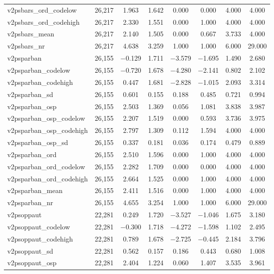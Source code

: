 \begin{table}[!htbp]
\begin{tabular}{@{\extracolsep{5pt}}lccccccc}
v2psbars\_ord\_codelow & 26,217 & 1.963 & 1.642 & 0.000 & 0.000 & 4.000 & 4.000 \\ 
v2psbars\_ord\_codehigh & 26,217 & 2.330 & 1.551 & 0.000 & 1.000 & 4.000 & 4.000 \\ 
v2psbars\_mean & 26,217 & 2.140 & 1.505 & 0.000 & 0.667 & 3.733 & 4.000 \\ 
v2psbars\_nr & 26,217 & 4.638 & 3.259 & 1.000 & 1.000 & 6.000 & 29.000 \\ 
v2psparban & 26,155 & $-$0.129 & 1.711 & $-$3.579 & $-$1.695 & 1.490 & 2.680 \\ 
v2psparban\_codelow & 26,155 & $-$0.720 & 1.678 & $-$4.280 & $-$2.141 & 0.802 & 2.102 \\ 
v2psparban\_codehigh & 26,155 & 0.447 & 1.681 & $-$2.828 & $-$1.015 & 2.093 & 3.314 \\ 
v2psparban\_sd & 26,155 & 0.601 & 0.155 & 0.188 & 0.485 & 0.721 & 0.994 \\ 
v2psparban\_osp & 26,155 & 2.503 & 1.369 & 0.056 & 1.081 & 3.838 & 3.987 \\ 
v2psparban\_osp\_codelow & 26,155 & 2.207 & 1.519 & 0.000 & 0.593 & 3.736 & 3.975 \\ 
v2psparban\_osp\_codehigh & 26,155 & 2.797 & 1.309 & 0.112 & 1.594 & 4.000 & 4.000 \\ 
v2psparban\_osp\_sd & 26,155 & 0.337 & 0.181 & 0.036 & 0.174 & 0.479 & 0.889 \\ 
v2psparban\_ord & 26,155 & 2.510 & 1.596 & 0.000 & 1.000 & 4.000 & 4.000 \\ 
v2psparban\_ord\_codelow & 26,155 & 2.282 & 1.709 & 0.000 & 0.000 & 4.000 & 4.000 \\ 
v2psparban\_ord\_codehigh & 26,155 & 2.664 & 1.525 & 0.000 & 1.000 & 4.000 & 4.000 \\ 
v2psparban\_mean & 26,155 & 2.411 & 1.516 & 0.000 & 1.000 & 4.000 & 4.000 \\ 
v2psparban\_nr & 26,155 & 4.655 & 3.254 & 1.000 & 1.000 & 6.000 & 29.000 \\ 
v2psoppaut & 22,281 & 0.249 & 1.720 & $-$3.527 & $-$1.046 & 1.675 & 3.180 \\ 
v2psoppaut\_codelow & 22,281 & $-$0.300 & 1.718 & $-$4.272 & $-$1.598 & 1.102 & 2.495 \\ 
v2psoppaut\_codehigh & 22,281 & 0.789 & 1.678 & $-$2.725 & $-$0.445 & 2.184 & 3.796 \\ 
v2psoppaut\_sd & 22,281 & 0.562 & 0.157 & 0.186 & 0.443 & 0.680 & 1.008 \\ 
v2psoppaut\_osp & 22,281 & 2.404 & 1.224 & 0.060 & 1.407 & 3.535 & 3.961 \\ 

\end{tabular}
\end{table}
